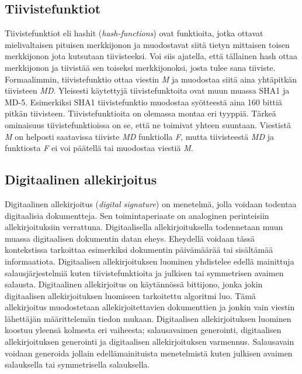  \subsection{Tiivistefunktiot}
 Tiivistefunktiot eli hashit (\emph{hash-functions}) ovat funktioita, jotka ottavat mielivaltaisen pituisen merkkijonon ja muodostavat siitä tietyn mittaisen toisen merkkijonon jota kutsutaan tiivisteeksi. Voi siis ajatella, että tällainen hash ottaa merkkijonon ja tiivistää sen toiseksi merkkijonoksi, josta tulee sana tiiviste. Formaalimmin, tiivistefunktio ottaa viestin \emph{M} ja muodostaa siitä aina yhtäpitkän tiivisteen \emph{MD}. Yleisesti käytettyjä tiivistefunktoita ovat muun muassa SHA1 ja MD-5. Esimerkiksi SHA1 tiivistefunktio muodostaa syötteestä aina 160 bittiä pitkän tiivisteen. Tiivistefunktioita on olemassa montaa eri tyyppiä. Tärkeä ominaisuus tiivistefunktioissa on se, että ne toimivat yhteen suuntaan. Viestistä \emph{M} on helposti saatavissa tiiviste \emph{MD} funktiolla \emph{F}, mutta tiivisteestä \emph{MD} ja funktiosta \emph{F} ei voi päätellä tai muodostaa viestiä \emph{M}.
 
 \subsection{Digitaalinen allekirjoitus}
 Digitaalinen allekirjoitus (\emph{digital signature}) on menetelmä, jolla voidaan todentaa digitaalisia dokumentteja. Sen toimintaperiaate on analoginen perinteisiin allekirjoituksiin verrattuna. Digitaalisella allekirjoituksella todennetaan muun muassa digitaalisen dokumentin datan eheys. Eheydellä voidaan tässä kontekstissa tarkoittaa esimerkiksi dokumentin päivämäärää tai sisältämää informaatiota. Digitaalisen allekirjoituksen luominen yhdistelee edellä mainittuja salausjärjestelmiä kuten tiivistefunktioita ja julkisen tai symmetrisen avaimen salausta. Digitaalinen allekirjoitus on käytännössä bittijono, jonka jokin digitaalisen allekirjoituksen luomiseen tarkoitettu algoritmi luo. Tämä allekirjoitus muodostetaan allekirjoitettavien dokumenttien ja jonkin vain viestin lähettäjän määrittelemän tiedon mukaan. Digitaalisen allekirjoituksen luominen koostuu yleensä kolmesta eri vaiheesta; salausavaimen generointi, digitaalisen allekirjoituksen generointi ja digitaalisen allekirjoituksen varmennus. Salausavain voidaan generoida jollain edellämainituista menetelmistä kuten julkisen avaimen salauksella tai symmetrisella salauksella.